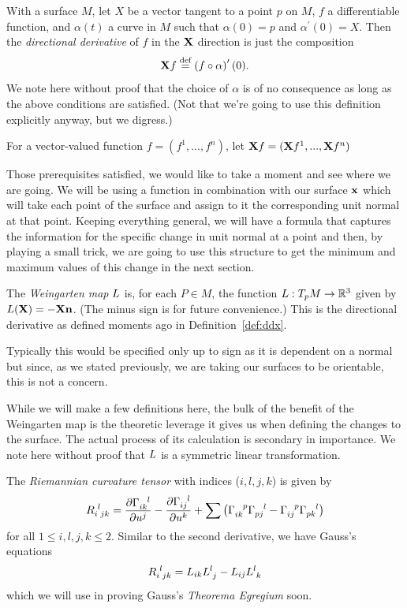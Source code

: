   \begin{defn}
    \label{def:ddx}
    With a surface $M$, let $X$ be a vector tangent to a point $p$ on $M$, $f$ a differentiable function, and $\alpha(t)$ a curve in $M$ such that $\alpha(0) = p$ and $\alpha^\prime(0) = X$. Then the \emph{directional derivative} of $f$ in the $\mathbf{X}$ direction is just the composition
    \[
      \mathbf{X} f \stackrel{\text{def}}{=} \left(f \circ \alpha\right)^\prime(0).
    \]
    We note here without proof that the choice of $\alpha$ is of no consequence as long as the above conditions are satisfied. (Not that we're going to use this definition explicitly anyway, but we digress.)

    For a vector-valued function $f = (f^1, ..., f^n)$, let $\mathbf{X} f = (\mathbf{X} f^1, ..., \mathbf{X} f^n)$
  \end{defn}

  Those prerequisites satisfied, we would like to take a moment and see where we are going. We will be using a function in combination with our surface $\mathbf{x}$ which will take each point of the surface and assign to it the corresponding unit normal at that point. Keeping everything general, we will have a formula that captures the information for the specific change in unit normal at a point and then, by playing a small trick, we are going to use this structure to get the minimum and maximum values of this change in the next section.

  \begin{defn}
    \label{def:wmap}
    The \emph{Weingarten map} $L$ is, for each $P \in M$, the function $L: T_pM\to \mathbb{R}^3$ given by $L(\mathbf{X}) = -\mathbf{X}\mathbf{n}$. (The minus sign is for future convenience.) This is the directional derivative as defined moments ago in Definition~\ref{def:ddx}.

    Typically this would be specified only up to sign as it is dependent on a normal but since, as we stated previously, we are taking our surfaces to be orientable, this is not a concern.
  \end{defn}

  While we will make a few definitions here, the bulk of the benefit of the Weingarten map is the theoretic leverage it gives us when defining the changes to the surface. The actual process of its calculation is secondary in importance. We note here without proof that $L$ is a symmetric linear transformation.

  \begin{defn}
    \label{def:riemannian_tensor}
    The \emph{Riemannian curvature tensor} with indices ($i, l, j, k$) is given by
    \begin{equation*}
      \Rmn = \frac{\del\cfl{i}{k}{l}}{\del u^j} - \frac{\del\cfl{i}{j}{l}}{\del u^k} + \sum\left(\cfl{i}{k}{p}\cfl{p}{j}{l} - \cfl{i}{j}{p}\cfl{p}{k}{l}\right)
    \end{equation*}
    for all $1 \le i, l, j, k \le 2$. Similar to the second derivative, we have Gauss's equations
    \begin{equation*}
      \Rmn = L_{ik}\llk{l}{j} - L_{ij}\Llk
    \end{equation*}
    which we will use in proving Gauss's \emph{Theorema Egregium} soon.
  \end{defn}

